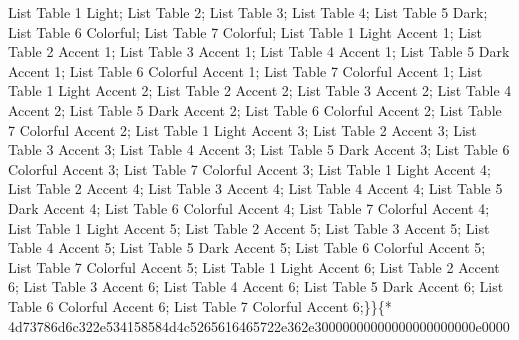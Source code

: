   List Table 1 Light; 
List Table 2;  List Table 3;
 List Table 4;  List Table 5 Dark;
  List Table 6 Colorful;
 List Table 7 Colorful;  List Table
1 Light Accent 1;  List Table 2 Accent
1;  List Table 3 Accent 1; 
 List Table 4 Accent 1;  List Table
5 Dark Accent 1;  List Table 6 Colorful Accent
1;  List Table 7 Colorful Accent 1;
  List Table 1 Light Accent 2;
 List Table 2 Accent 2;  List Table
3 Accent 2;  List Table 4 Accent 2;
  List Table 5 Dark Accent 2;
 List Table 6 Colorful Accent 2; 
List Table 7 Colorful Accent 2;  List Table 1
Light Accent 3;   List Table 2 Accent
3;  List Table 3 Accent 3;
 List Table 4 Accent 3;  List Table
5 Dark Accent 3;   List Table 6 Colorful Accent
3;  List Table 7 Colorful Accent
3;  List Table 1 Light Accent 4;
 List Table 2 Accent 4;   List Table
3 Accent 4;  List Table 4 Accent
4;  List Table 5 Dark Accent 4;
 List Table 6 Colorful Accent 4;  
List Table 7 Colorful Accent 4;  List Table 1
Light Accent 5;  List Table 2 Accent
5;  List Table 3 Accent 5; 
 List Table 4 Accent 5;  List Table
5 Dark Accent 5;  List Table 6 Colorful Accent
5;  List Table 7 Colorful Accent 5;
  List Table 1 Light Accent 6;
 List Table 2 Accent 6;  List Table
3 Accent 6;  List Table 4 Accent 6;
  List Table 5 Dark Accent 6;
 List Table 6 Colorful Accent 6; 
List Table 7 Colorful Accent
6;\}\}\{*
4d73786d6c322e534158584d4c5265616465722e362e30000000000000000000000e0000
